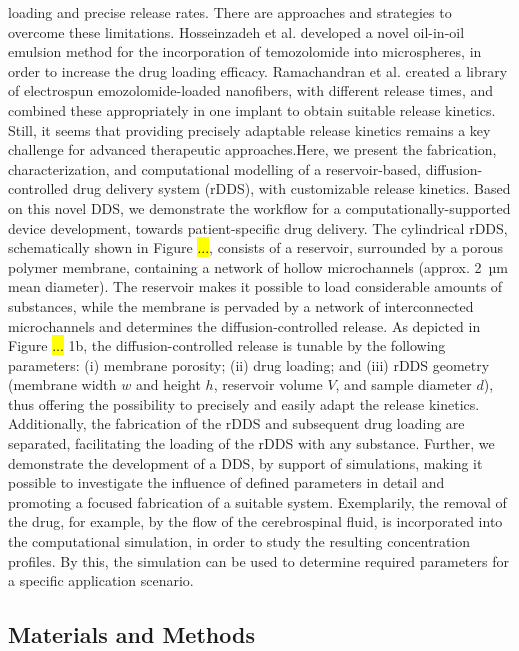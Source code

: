loading and precise release rates. There are approaches and strategies to overcome these limitations. Hosseinzadeh et al.\supercite{hosseinzadeh2019drug} developed a novel oil-in-oil emulsion method for the incorporation of temozolomide into microspheres, in order to increase the drug loading efficacy. Ramachandran et al.\supercite{ramachandran2017theranostic} created a library of electrospun emozolomide-loaded nanofibers, with different release times, and combined these appropriately in one implant to obtain suitable release kinetics. Still, it seems that providing precisely adaptable release kinetics remains a key challenge for advanced therapeutic approaches.Here, we present the fabrication, characterization, and computational modelling of a reservoir-based, diffusion-controlled drug delivery system (rDDS), with customizable release kinetics. Based on this novel DDS, we demonstrate the workflow for a computationally-supported device development, towards patient-specific drug delivery. The cylindrical rDDS, schematically shown in Figure \hl{...}, consists of a reservoir, surrounded by a porous polymer membrane, containing a network of hollow microchannels (approx. 2~µm mean diameter). The reservoir makes it possible to load considerable amounts of substances, while the membrane is pervaded by a network of interconnected microchannels and determines the diffusion-controlled release. As depicted in Figure \hl{...} 1b, the diffusion-controlled release is tunable by the following parameters: (i) membrane porosity; (ii) drug loading; and (iii) rDDS geometry (membrane width $w$ and height $h$, reservoir volume $V$, and sample diameter $d$), thus offering the possibility to precisely and easily adapt the release kinetics. Additionally, the fabrication of the rDDS and subsequent drug loading are separated, facilitating the loading of the rDDS with any substance. Further, we demonstrate the development of a DDS, by support of simulations, making it possible to investigate the influence of defined parameters in detail and promoting a focused fabrication of a suitable system. Exemplarily, the removal of the drug, for example, by the flow of the cerebrospinal fluid, is incorporated into the computational simulation, in order to study the resulting concentration profiles. By this, the simulation can be used to determine required parameters for a specific application scenario.

\subsection{Materials and Methods}
